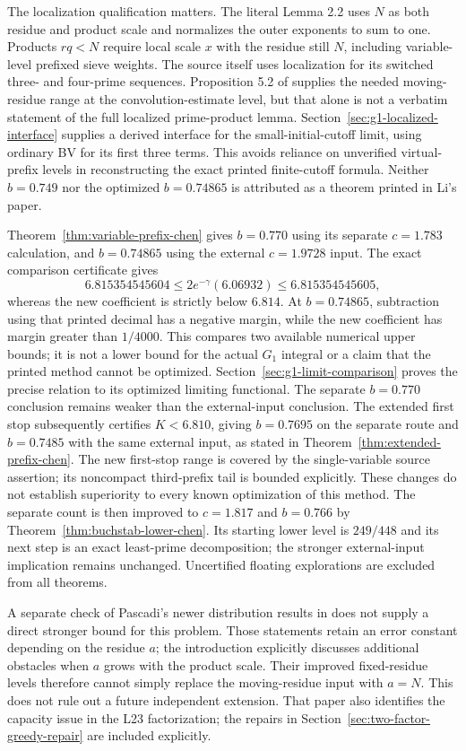 \documentclass[11pt]{article}
\begin{document}
The localization qualification matters. The literal Lemma 2.2
uses $N$ as both residue and product scale and normalizes the outer
exponents to sum to one. Products $rq<N$ require local scale $x$
with the residue still $N$, including variable-level prefixed sieve
weights. The source itself uses localization for its switched
three- and four-prime sequences. Proposition 5.2 of
\cite{Lichtman2023} supplies the needed moving-residue range at
the convolution-estimate level, but that alone is not a verbatim
statement of the full localized prime-product lemma.
Section~\ref{sec:g1-localized-interface} supplies a derived interface
for the small-initial-cutoff limit, using ordinary BV for its first
three terms. This avoids reliance on unverified virtual-prefix
levels in reconstructing the exact printed finite-cutoff formula.
Neither $b=0.749$ nor the optimized $b=0.74865$ is attributed as
a theorem printed in Li's paper.

Theorem~\ref{thm:variable-prefix-chen} gives $b=0.770$ using its
separate $c=1.783$ calculation, and $b=0.74865$ using the external
$c=1.9728$ input. The exact comparison certificate gives
\[
 6.815354545604\le2e^{-\gamma}(6.06932)
                  \le6.815354545605,
\]
whereas the new coefficient is strictly below $6.814$.
At $b=0.74865$, subtraction using that printed decimal has a
negative margin, while the new coefficient has margin greater
than $1/4000$. This compares two available numerical upper bounds;
it is not a lower bound for the actual $G_1$ integral or a claim
that the printed method cannot be optimized.
Section~\ref{sec:g1-limit-comparison} proves the precise relation
to its optimized limiting functional. The separate $b=0.770$
conclusion remains weaker than the external-input conclusion.
The extended first stop subsequently certifies $K<6.810$, giving
$b=0.7695$ on the separate route and $b=0.7485$ with the same external
input, as stated in Theorem~\ref{thm:extended-prefix-chen}. The new
first-stop range is covered by the single-variable source assertion;
its noncompact third-prefix tail is bounded explicitly. These changes
do not establish superiority to every known optimization of this method.
The separate count is then improved to $c=1.817$ and $b=0.766$ by
Theorem~\ref{thm:buchstab-lower-chen}. Its starting lower level is
$249/448$ and its next step is an exact least-prime decomposition;
the stronger external-input implication remains unchanged.
Uncertified floating explorations are excluded from all theorems.

A separate check of Pascadi's newer distribution results in
\cite[Theorems 1.3 and 5.4, Proposition 4.4]{Pascadi2025}
does not supply a direct stronger bound for this problem. Those
statements retain an error constant depending on the residue $a$;
the introduction explicitly discusses additional obstacles when
$a$ grows with the product scale. Their improved fixed-residue
levels therefore cannot simply replace the moving-residue input
with $a=N$. This does not rule out a future independent extension.
That paper also identifies the capacity issue in the L23
factorization; the repairs in
Section~\ref{sec:two-factor-greedy-repair} are included explicitly.
\end{document}
